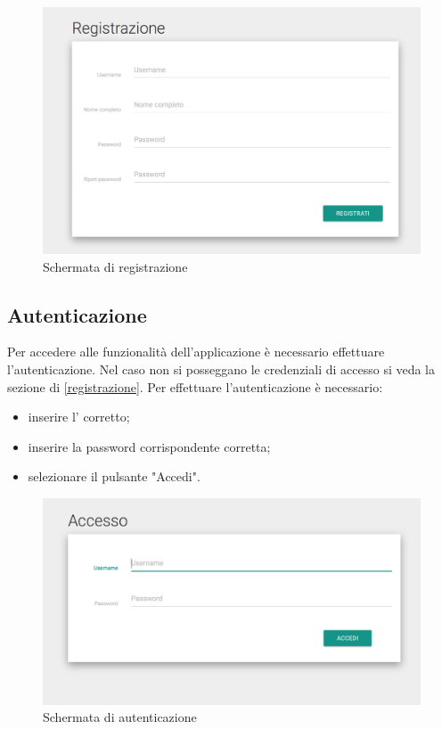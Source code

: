 \documentclass[12pt,a4paper]{article}
\begin{document}
\begin{figure}[h]
		
\centering
\includegraphics[width=\linewidth]{../img/screenshot/signup.png}
\caption{Schermata di registrazione}
\label{Schermata di registrazione}
\end{figure}


	\subsection{Autenticazione}\label{autenticazione}
	Per accedere alle funzionalità dell'applicazione è necessario effettuare l'autenticazione. Nel caso non si posseggano le credenziali di accesso si veda la sezione di \ref{registrazione}.
	Per effettuare l'autenticazione è necessario:
	\begin{itemize}
		\item inserire l' corretto;
		\item inserire la password corrispondente corretta;
		\item selezionare il pulsante "Accedi".
	\end{itemize}
	
		\begin{figure}[h]
		
		\centering
		\includegraphics[width=\linewidth]{../img/screenshot/loginCrop.png}
		\caption{Schermata di autenticazione}
		\label{Schermata di autenticazione}
		\end{figure}
		
\end{document}
